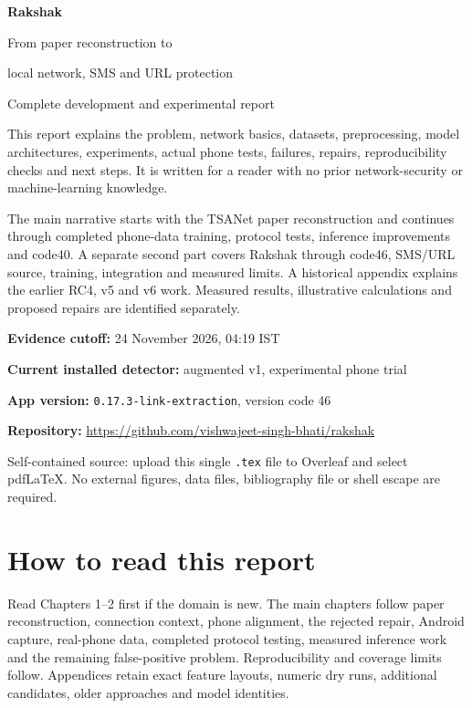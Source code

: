 \documentclass[11pt,a4paper,oneside]{report}
\newcommand{\code}[1]{\nolinkurl{#1}}
\begin{document}
\hypersetup{pageanchor=false}
\begin{titlepage}
\centering\vspace*{17mm}
{\Huge\bfseries Rakshak\par}\vspace{7mm}
{\LARGE From paper reconstruction to\par local network, SMS and URL protection\par}\vspace{12mm}
{\Large Complete development and experimental report\par}\vspace{10mm}
\begin{minipage}{0.88\textwidth}
This report explains the problem, network basics, datasets, preprocessing, model architectures, experiments, actual phone tests, failures, repairs, reproducibility checks and next steps. It is written for a reader with no prior network-security or machine-learning knowledge.

The main narrative starts with the TSANet paper reconstruction and continues through completed phone-data training, protocol tests, inference improvements and code40. A separate second part covers Rakshak through code46, SMS/URL source, training, integration and measured limits. A historical appendix explains the earlier RC4, v5 and v6 work. Measured results, illustrative calculations and proposed repairs are identified separately.
\end{minipage}
\vfill
\textbf{Evidence cutoff:} 24 November 2026, 04:19 IST\par
\textbf{Current installed detector:} augmented v1, experimental phone trial\par
\textbf{App version:} \code{0.17.3-link-extraction}, version code 46\par
\textbf{Repository:} \url{https://github.com/vishwajeet-singh-bhati/rakshak}\par
\vspace{8mm}
{\small Self-contained source: upload this single \code{.tex} file to Overleaf and select pdfLaTeX. No external figures, data files, bibliography file or shell escape are required.}
\end{titlepage}
\hypersetup{pageanchor=true}
\chapter*{How to read this report}
Read Chapters 1--2 first if the domain is new. The main chapters follow paper reconstruction, connection context, phone alignment, the rejected repair, Android capture, real-phone data, completed protocol testing, measured inference work and the remaining false-positive problem. Reproducibility and coverage limits follow. Appendices retain exact feature layouts, numeric dry runs, additional candidates, older approaches and model identities.
\end{document}
